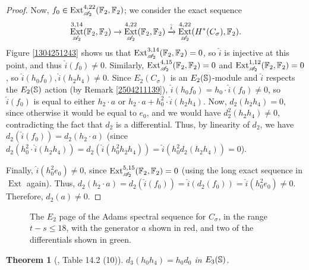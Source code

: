 \documentclass[11pt, titlepage]{article} %
\def\bb{\ensuremath\mathbb}
\def\A{\ensuremath{\mathscr{A}_2}}
\DeclareMathOperator{\Ext}{Ext}
\numberwithin{equation}{subsection}
\theoremstyle{plain}
\newtheorem{theorem}{Theorem}[subsection]
\theoremstyle{definition}
\begin{document}
\begin{proof}
Now, \(f_0\in \Ext_{\A}^{4,22}(\bb{F}_2, \bb{F}_2)\); we consider the exact sequence
\[\Ext_{\A}^{3,14}(\bb{F}_2, \bb{F}_2)\to \Ext_{\A}^{4,22}(\bb{F}_2, \bb{F}_2) \xrightarrow{\hat i} \Ext_{\A}^{4,22}(H^*(C_\sigma), \bb{F}_2).\]
Figure \ref{1304251243} shows us that \(\Ext_{\A}^{3,14}(\bb{F}_2, \bb{F}_2)=0\), so \(\hat i\) is injective at this point, and thus \(\hat i(f_0)\neq 0\). Similarly, \(\Ext_{\A}^{4,15}(\bb{F}_2, \bb{F}_2)=0\) and \(\Ext_{\A}^{1,12}(\bb{F}_2, \bb{F}_2)=0\), so \(\hat i(h_0f_0), \hat i(h_2h_4)\neq 0\). Since \(E_2(C_\sigma)\) is an \(E_2(\bb{S})\)-module and \(\hat i\) respects the \(E_2(\bb{S})\) action (by Remark \ref{2504211139}), \(\hat i(h_0f_0)=h_0\cdot\hat i(f_0)\neq 0\), so \(\hat i(f_0)\) is equal to either \(h_2\cdot a\) or \(h_2\cdot a+h_0^2\cdot\hat{i}(h_2h_4)\). Now, \(d_2(h_2h_4)=0\), since otherwise it would be equal to \(e_0\), and we would have \(d_2^2(h_2h_4)\neq 0\), contradicting the fact that \(d_2\) is a differential. Thus, by linearity of \(d_2\), we have \(d_2(\hat i(f_0))=d_2(h_2\cdot a)\) (since \(d_2(h_0^2\cdot\hat i (h_2h_4))=d_2(\hat i(h_0^2h_2h_4))=\hat i(h_0^2d_2(h_2h_4))=0\)).

Finally, \(\hat i(h_0^2e_0)\neq 0\), since \(\Ext_{\A}^{5,15}(\bb{F}_2, \bb{F}_2)=0\) (using the long exact sequence in \(\Ext\) again). Thus, \(d_2(h_2\cdot a)=
d_2(\hat i(f_0))=\hat i(d_2(f_0))=\hat i(h_0^2e_0)\neq 0\). Therefore, \(d_2(a)\neq 0\).
\end{proof}

\begin{figure}
\centering

\caption{The \(E_2\) page of the Adams spectral sequence for \(C_\sigma\), in the range \(t-s\leq 18\), with the generator \(a\) shown in red, and two of the differentials shown in green.}
\label{2504131812}
\end{figure}

\begin{theorem}[{\autocite{rognes2}, Table 14.2 (10)}]
\(d_3(h_0h_4)=h_0d_0\) in \(E_3(\bb{S})\).
\end{theorem}
\end{document}
